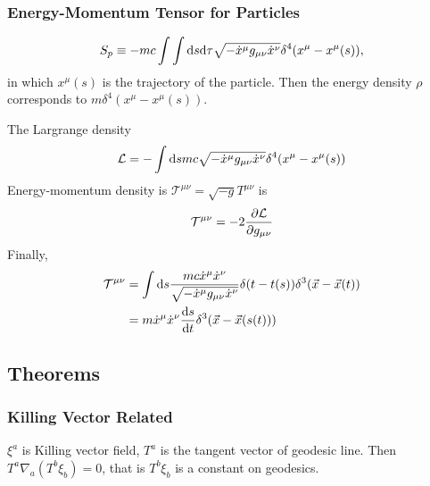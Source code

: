 \documentclass[letterpaper,10pt,english]{sphinxmanual}
\begin{document}
\subsubsection{Energy-Momentum Tensor for Particles}
\label{relativity/GeneralRelativity:energy-momentum-tensor-for-particles}\begin{gather}
\begin{split}S_p \equiv -m c \int \int \mathrm d s\mathrm d\tau \sqrt{-\dot x ^\mu g_{\mu\nu} \dot x^\nu} \delta^4(x^\mu - x^\mu (s))    ,\end{split}\notag
\end{gather}
in which \(x^\mu(s)\) is the trajectory of the particle. Then the energy density \(\rho\) corresponds to \(m\delta^4(x^\mu- x^\mu(s))\).

The Largrange density
\begin{gather}
\begin{split}\mathcal L = -\int\mathrm ds mc \sqrt{-\dot x^\mu g_{\mu\nu}\dot x^\nu}\delta^4(x^\mu - x^\mu(s))\end{split}\notag
\end{gather}
Energy-momentum density is \(\mathcal T^{\mu\nu} = \sqrt{-g}T^{\mu\nu}\) is
\begin{gather}
\begin{split}\mathcal T^{\mu\nu} = -2 \frac{\partial \mathcal L}{\partial g_{\mu\nu}}\end{split}\notag
\end{gather}
Finally,
\begin{gather}
\begin{split}\mathcal T^{\mu\nu} &= \int \mathrm ds \frac{mc\dot x^\mu \dot x^\nu}{\sqrt{-\dot x^\mu g_{\mu\nu} \dot x^\nu}} \delta(t-t(s))\delta^3(\vec x - \vec x(t)) \\
&= m\dot x^\mu \dot x^\nu \frac{\mathrm d s}{\mathrm d t} \delta^3(\vec x - \vec x(s(t)))\end{split}\notag
\end{gather}

\subsection{Theorems}
\label{relativity/GeneralRelativity:theorems}

\subsubsection{Killing Vector Related}
\label{relativity/GeneralRelativity:killing-vector-related}
\(\xi^a\) is Killing vector field, \(T^a\) is the tangent vector of geodesic line. Then \(T^a\nabla_a(T^b\xi_b)=0\), that is \(T^b\xi_b\) is a constant on geodesics.
\end{document}
